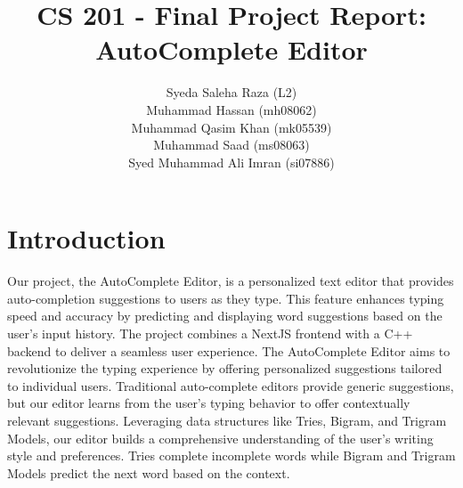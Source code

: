 \documentclass{article}
\begin{document}
\title{CS 201 - Final Project Report: AutoComplete Editor}
\author{
    Syeda Saleha Raza (L2) \\
    Muhammad Hassan (mh08062) \\
    Muhammad Qasim Khan (mk05539) \\
    Muhammad Saad (ms08063) \\
    Syed Muhammad Ali Imran (si07886)
}
\date{}
\maketitle

\section*{Introduction}
Our project, the AutoComplete Editor, is a personalized text editor that provides auto-completion suggestions to users as they type. This feature enhances typing speed and accuracy by predicting and displaying word suggestions based on the user's input history. The project combines a NextJS frontend with a C++ backend to deliver a seamless user experience. The AutoComplete Editor aims to revolutionize the typing experience by offering personalized suggestions tailored to individual users. Traditional auto-complete editors provide generic suggestions, but our editor learns from the user's typing behavior to offer contextually relevant suggestions. Leveraging data structures like Tries, Bigram, and Trigram Models, our editor builds a comprehensive understanding of the user's writing style and preferences. Tries complete incomplete words while Bigram and Trigram Models predict the next word based on the context.
\end{document}
